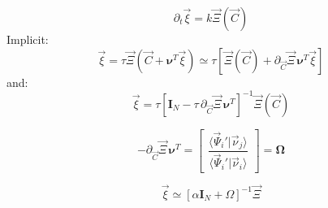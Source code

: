 \documentclass[aps,12pt]{revtex4}
\begin{document}
\begin{equation}
	\partial_t \vec{\xi} = k\vec{\Xi}(\vec{C})
\end{equation}
Implicit:
\begin{equation}
	\vec{\xi} = \tau \vec{\Xi}(\vec{C}+\bm{\nu}^T \vec{\xi} ) 
	\simeq \tau \left[ \vec{\Xi}(\vec{C}) + \partial_{\vec{C}}\vec{\Xi} \, \bm{\nu}^T \vec{\xi} \right]
\end{equation}
and:
\begin{equation}
	\vec{\xi} = \tau \left[ \bm{I}_N - \tau \, \partial_{\vec{C}}\vec{\Xi} \, \bm{\nu}^T \right]^{-1} \vec{\Xi}(\vec{C}) 
\end{equation}

\begin{equation}
	- \partial_{\vec{C}}\vec{\Xi} \, \bm{\nu}^T = 
	\begin{bmatrix}
		 \dfrac{\langle \vec{\Psi}_i' \vert \vec{\nu}_j \rangle}{\langle \vec{\Psi}_i' \vert \vec{\nu}_i \rangle} 	
	\end{bmatrix}
	 = \bm{\Omega}
\end{equation}

\begin{equation}
	\vec{\xi} \simeq \left[ \alpha \bm{I}_N + \Omega \right]^{-1} \vec{\Xi}
\end{equation}




 
\end{document}
